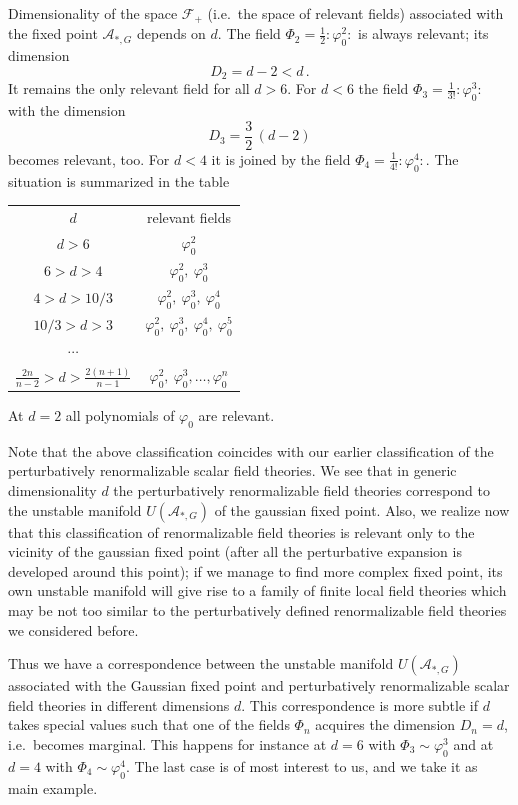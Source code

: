 Dimensionality of the space $\mathcal F_+$ (i.e.\ the space of relevant fields)
associated with the fixed point $\mathcal A_{*,G}$ depends on $d$. The field
$\Phi_2=\frac12{:}\varphi_0^2{:}$ is always relevant; its dimension
\[
D_2=d-2<d\,.
\]
It remains the only relevant field for all $d>6$. For $d<6$ the field
$\Phi_3=\frac1{3!}{:}\varphi_0^3{:}$ with the dimension
\[
D_3=\frac32\,(d-2)
\]
becomes relevant, too. For $d<4$ it is joined by the field
$\Phi_4=\frac1{4!}{:}\varphi_0^4{:}$. The situation is summarized in the table
\begin{center}
\begin{tabular}{cc}
$d$ & relevant fields\\[4pt]
$d>6$ & $\varphi_0^2$\\
$6>d>4$ & $\varphi_0^2,\ \varphi_0^3$\\
$4>d>10/3$ & $\varphi_0^2,\ \varphi_0^3,\ \varphi_0^4$\\
$10/3>d>3$ & $\varphi_0^2,\ \varphi_0^3,\ \varphi_0^4,\ \varphi_0^5$\\
$\cdots$ & \\
$\frac{2n}{n-2}>d>\frac{2(n+1)}{n-1}$ & $\varphi_0^2,\ \varphi_0^3,\dots,\varphi_0^n$
\end{tabular}
\end{center}
At $d=2$ all polynomials of $\varphi_0$ are relevant.

Note that the above classification coincides with our earlier classification of
the perturbatively renormalizable scalar field theories. We see that in generic
dimensionality $d$ the perturbatively renormalizable field theories correspond to
the unstable manifold $U(\mathcal A_{*,G})$ of the gaussian fixed point. Also, we
realize now that this classification of renormalizable field theories is relevant
only to the vicinity of the gaussian fixed point (after all the perturbative
expansion is developed around this point); if we manage to find more complex fixed
point, its own unstable manifold will give rise to a family of finite local field
theories which may be not too similar to the perturbatively defined renormalizable
field theories we considered before.

Thus we have a correspondence between the unstable manifold $U(\mathcal A_{*,G})$
associated with the Gaussian fixed point and perturbatively renormalizable scalar
field theories in different dimensions $d$. This correspondence is more subtle if
$d$ takes special values such that one of the fields $\Phi_n$ acquires the
dimension $D_n=d$, i.e.\ becomes marginal. This happens for instance at $d=6$ with
$\Phi_3\sim\varphi_0^3$ and at $d=4$ with $\Phi_4\sim\varphi_0^4$. The last case is
of most interest to us, and we take it as main example.

